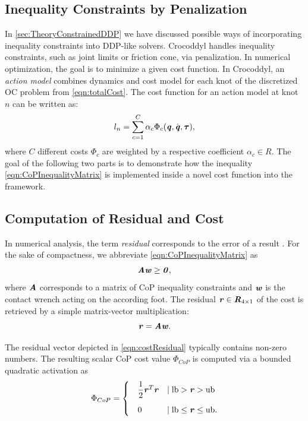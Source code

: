 \subsection{Inequality Constraints by Penalization}
In \cref{sec:TheoryConstrainedDDP} we have discussed possible ways of incorporating inequality constraints into DDP-like solvers. Crocoddyl handles inequality constraints, such as joint limits or friction cone, via penalization. 
In numerical optimization, the goal is to minimize a given cost function. In Crocoddyl, an \textit{action model} combines dynamics and cost model for each knot of the discretized \gls{OC} problem from \cref{eqn:totalCost}. The cost function for an action model at knot $n$ can be written as: 
\begin{equation}\label{eqn:costSum}
l_n=\sum_{c=1}^{C}\alpha_c\Phi_c(\bm{\mathit{q}},\dot{\bm{\mathit{q}}}, \bm{\mathit{\tau}}), 
\end{equation}
where $C$ different costs $\Phi_c$ are weighted by a respective coefficient $\alpha_c\in R$. The goal of the following two parts is to demonstrate how the inequality \cref{eqn:CoPInequalityMatrix} is implemented inside a novel cost function into the framework.

\subsection{Computation of Residual and Cost}
In numerical analysis, the term \textit{residual} corresponds to the error of a result \cite{shewchuk1994introduction}. For the sake of compactness, we abbreviate \cref{eqn:CoPInequalityMatrix} as 
\begin{equation} \label{eqn:costPositive}
\bm{\mathit{A}} \bm{\mathit{w}} \geq \bm{\mathit{0}},
\end{equation}
where $\bm{\mathit{A}}$ corresponds to a matrix of \gls{CoP} inequality constraints and $\bm{\mathit{w}}$ is the contact wrench acting on the according foot. The residual $\bm{\mathit{r}}\in \bm{\mathit{R}}_{4\times 1}$ of the cost is retrieved by a simple matrix-vector multiplication:
\begin{equation}\label{eqn:costResidual}
\bm{\mathit{r}} = \bm{\mathit{A}} \bm{\mathit{w}}.
\end{equation} 

The residual vector depicted in \cref{eqn:costResidual} typically contains non-zero numbers. The resulting scalar \gls{CoP} cost value $\Phi_{CoP}$ is computed via a bounded quadratic activation as
\begin{equation}\label{eqn:CoPCostComputation}
\Phi_{CoP}=
\begin{cases}
\quad\dfrac{1}{2}\bm{\mathit{r}}^T\bm{\mathit{r}} &\mid \text{lb} > \bm{\mathit{r}} > \text{ub} \\[10pt]
\quad 0 &\mid \text{lb} \leq \bm{\mathit{r}} \leq \text{ub}.
\end{cases}
\end{equation}

